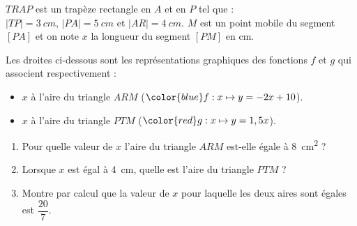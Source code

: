 %
%
    \begin{minipage}{.48\linewidth}
        
    \end{minipage}
    \begin{minipage}{.48\linewidth}
        $TRAP$ est un trapèze rectangle en $A$ et en $P$ tel que :\\
    $|TP| = \SI{3}{cm}$, $|PA| = \SI{5}{cm}$ et $|AR|=\SI{4}{cm}$.\medbreak
    $M$ est un point mobile du segment $[PA]$ et on note $x$ la longueur du segment $[PM]$ en cm.
    \end{minipage}


    Les droites ci-dessous sont les représentations graphiques des fonctions $f$ et $g$ qui associent respectivement :
    \begin{itemize}[label=]
        \item $x$ à l'aire du triangle $ARM$ ($\color{blue}f:x\mapsto y= -2x+10$).
        \item $x$ à l'aire du triangle $PTM$ ($\color{red}g:x\mapsto y=1,5x$).
    \end{itemize}

    

    \begin{enumerate}[resume=mine]
        \item Pour quelle valeur de $x$ l'aire du triangle $ARM$ est-elle égale à \SI{8}{cm^2} ?
        \item Lorsque $x$ est égal à \SI{4}{cm}, quelle est l'aire du triangle $PTM$ ?
        \item Montre par calcul que la valeur de $x$ pour laquelle les deux aires sont égales est $\dfrac{20}{7}$.
    \end{enumerate}
